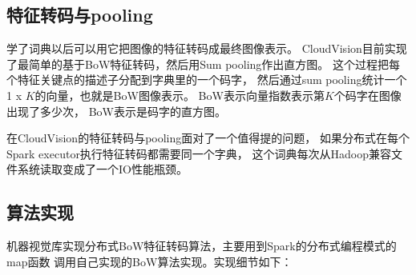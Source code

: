\subsection{特征转码与pooling}
\label{subsec:feature-encoding}
学了词典以后可以用它把图像的特征转码成最终图像表示。
CloudVision目前实现了最简单的基于BoW特征转码，然后用Sum pooling作出直方图。
这个过程把每个特征关键点的描述子分配到字典里的一个码字，
然后通过sum pooling统计一个1 x $K$的向量，也就是BoW图像表示。
BoW表示向量指数表示第$K$个码字在图像出现了多少次，
BoW表示是码字的直方图。

在CloudVision的特征转码与pooling面对了一个值得提的问题，
如果分布式在每个Spark executor执行特征转码都需要同一个字典，
这个词典每次从Hadoop兼容文件系统读取变成了一个IO性能瓶颈。

\subsection*{算法实现}
机器视觉库实现分布式BoW特征转码算法，主要用到Spark的分布式编程模式的map函数
调用自己实现的BoW算法实现。实现细节如下：
